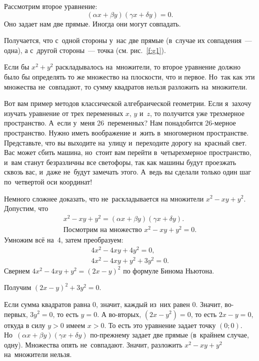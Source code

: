 Рассмотрим второе уравнение:
$$
(\alpha x+\beta y)(\gamma x+\delta y)=0.
$$
Оно задает нам две прямые. Иногда они могут совпадать.


Получается, что с~одной стороны у~нас две прямые (в~случае их совпадения~--- одна), а с~другой
стороны~--- точка (см. рис.~\ref{f:g1}).

Если бы $x^{2}+y^{2}$ раскладывалось на~множители, то второе уравнение должно было бы определять
то же множество на плоскости, что и первое.
Но~так как эти множества не~совпадают, то сумму квадратов нельзя разложить на~множители.

Вот вам пример методов классической алгебраической геометрии. Если я~захочу изучать уравнение от трех переменных $x$,
$y$ и~$z$, то получится уже трехмерное пространство. А~если у~меня 26~переменных? Нам понадобится
26-мерное пространство. Нужно иметь воображение и~жить в~многомерном пространстве. Представьте, что вы
выходите на~улицу и~переходите дорогу на~красный свет. Вас может сбить машина, но~стоит вам перейти
в~четырехмерное пространство, и~вам станут безразличны все светофоры, так как машины будут
проезжать сквозь вас, и~даже не~будут замечать этого. А~ведь вы сделали только один шаг по~четвертой
оси координат!

Немного сложнее доказать, что не~раскладывается на множители $x^{2}-xy+y^{2}$. Допустим, что
\begin{gather*}
x^{2}-xy+y^{2}=(\alpha x+\beta y)(\gamma x+\delta y).\\
\text{Посмотрим на множество }x^{2}-xy+y^{2}=0.
\end{gather*}
Умножим всё на~4, затем преобразуем:
\begin{gather*}
4x^{2}-4xy+4y^{2}=0,\\
4x^{2}-4xy+y^{2}+3y^{2}=0.
\end{gather*}
Свернем $4x^{2}-4xy+y^{2}=(2x-y)^{2}$ по формуле Бинома Ньютона.

Получим $(2x-y)^{2}+3y^{2}=0.$

Если сумма квадратов равна 0, значит, каждый из~них равен 0. Значит, во-первых, $3y^{2} = 0$, то
есть $y=0$. А во-вторых, $(2x-y^{2})=0$, то есть $2x-y=0$, откуда в силу  $y>0$ имеем $x>0$.  То
есть это уравнение задает точку $(0;0)$. Но~$(\alpha x+\beta y)(\gamma x+\delta y)$ по-прежнему
задает две прямые (в~крайнем случае, одну). Множества опять не~совпадают. Значит, разложить
$x^{2}-xy+y^{2}$ на~множители нельзя.

